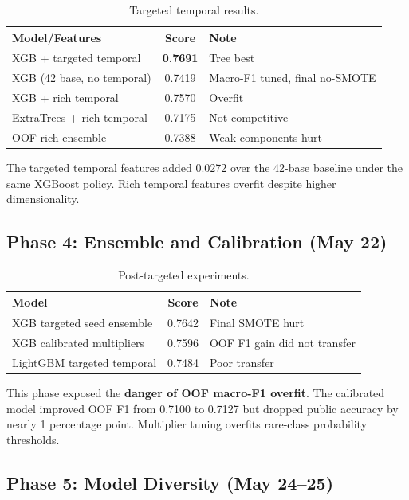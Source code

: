 \documentclass[12pt, a4paper]{article}
\begin{document}
\begin{table}[h]
\centering
\caption{Targeted temporal results.}
\label{tab:phase3}
\begin{tabular}{@{}lcl@{}}
\toprule
\textbf{Model/Features} & \textbf{Score} & \textbf{Note} \\ \midrule
XGB + targeted temporal & \textbf{0.7691} & Tree best \\
XGB (42 base, no temporal) & 0.7419 & Macro-F1 tuned, final no-SMOTE \\
XGB + rich temporal & 0.7570 & Overfit \\
ExtraTrees + rich temporal & 0.7175 & Not competitive \\
OOF rich ensemble & 0.7388 & Weak components hurt \\ \bottomrule
\end{tabular}
\end{table}

The targeted temporal features added 0.0272 over the 42-base baseline under the same XGBoost policy. Rich temporal features overfit despite higher dimensionality.

\subsection{Phase 4: Ensemble and Calibration (May 22)}

\begin{table}[h]
\centering
\caption{Post-targeted experiments.}
\label{tab:phase4}
\begin{tabular}{@{}lcl@{}}
\toprule
\textbf{Model} & \textbf{Score} & \textbf{Note} \\ \midrule
XGB targeted seed ensemble & 0.7642 & Final SMOTE hurt \\
XGB calibrated multipliers & 0.7596 & OOF F1 gain did not transfer \\
LightGBM targeted temporal & 0.7484 & Poor transfer \\ \bottomrule
\end{tabular}
\end{table}

This phase exposed the \textbf{danger of OOF macro-F1 overfit}. The calibrated model improved OOF F1 from 0.7100 to 0.7127 but dropped public accuracy by nearly 1 percentage point. Multiplier tuning overfits rare-class probability thresholds.

\subsection{Phase 5: Model Diversity (May 24--25)}
\end{document}
